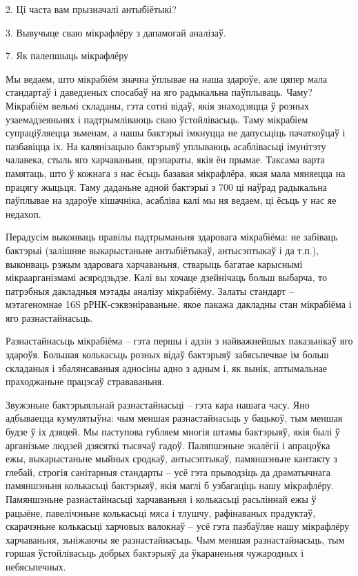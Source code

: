 2. Ці часта вам прызначалі антыбіётыкі?

3. Вывучыце сваю мікрафлёру з дапамогай аналізаў.


7. Як палепшыць мікрафлёру

Мы ведаем, што мікрабіём значна ўплывае на наша здароўе, але цяпер мала стандартаў і даведзеных спосабаў на яго радыкальна паўплываць. Чаму? Мікрабіём вельмі складаны, гэта сотні відаў, якія знаходзяцца ў розных узаемадзеяньнях і падтрымліваюць сваю ўстойлівасьць. Таму мікрабіем супраціўляецца зьменам, а нашы бактэрыі імкнуцца не дапусьціць пачаткоўцаў і пазбавіцца іх. На калянізацыю бактэрыяў уплываюць асаблівасьці імунітэту чалавека, стыль яго харчаваньня, прэпараты, якія ён прымае. Таксама варта памятаць, што ў кожнага з нас ёсьць базавая мікрафлёра, якая мала мяняецца на працягу жыцьця. Таму даданьне адной бактэрыі з 700 ці наўрад радыкальна паўплывае на здароўе кішачніка, асабліва калі мы ня ведаем, ці ёсьць у нас яе недахоп.

Перадусім выконваць правілы падтрыманьня здаровага мікрабіёма: не забіваць бактэрыі (залішняе выкарыстаньне антыбіётыкаў, антысэптыкаў і да т.п.), выконваць рэжым здаровага харчаваньня, стварыць багатае карыснымі мікраарганізмамі асяродзьдзе. Калі вы хочаце дзейнічаць больш выбарча, то патрэбныя дакладныя мэтады аналізу мікрабіёму. Залаты стандарт – мэтагеномнае 16S рРНК-сэквэніраваньне, якое пакажа дакладны стан мікрабіёма і яго разнастайнасьць.

Разнастайнасьць мікрабіёма – гэта першы і адзін з найважнейшых паказьнікаў яго здароўя. Большая колькасьць розных відаў бактэрыяў забясьпечвае ім больш складаныя і збалянсаваныя адносіны адно з адным і, як вынік, аптымальнае праходжаньне працэсаў страваваньня.

Звужэньне бактэрыяльнай разнастайнасьці – гэта кара нашага часу. Яно адбываецца кумулятыўна: чым меншая разнастайнасьць у бацькоў, тым меншая будзе ў іх дзяцей. Мы паступова губляем многія штамы бактэрыяў, якія былі ў арганізьме людзей дзясяткі тысячаў гадоў. Паляпшэньне экалёгіі і апрацоўка ежы, выкарыстаньне мыйных сродкаў, антысэптыкаў, памяншэньне кантакту з глебай, строгія санітарныя стандарты – усё гэта прыводзіць да драматычнага памяншэньня колькасьці бактэрыяў, якія маглі б узбагаціць нашу мікрафлёру. Памяншэньне разнастайнасьці харчаваньня і колькасьці расьліннай ежы ў рацыёне, павелічэньне колькасьці мяса і тлушчу, рафінаваных прадуктаў, скарачэньне колькасьці харчовых валокнаў – усё гэта пазбаўляе нашу мікрафлёру харчаваньня, зьніжаючы яе разнастайнасьць. Чым меншая разнастайнасьць, тым горшая ўстойлівасьць добрых бактэрыяў да ўкараненьня чужародных і небясьпечных.

